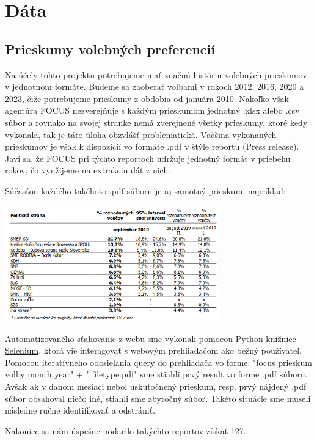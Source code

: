 \documentclass[main.tex]{subfiles}
\begin{document}
\section{Dáta}

\subsection{Prieskumy volebných preferencií}
Na účely tohto projektu potrebujeme mať značnú históriu volebných prieskumov v jednotnom formáte. Budeme sa zaoberať voľbami v rokoch 2012, 2016, 2020 a 2023, čiže potrebujeme prieskumy z obdobia od januára 2010.
Nakoľko však agentúra FOCUS nezverejňuje s každým prieskumom jednotný .xlsx alebo .csv súbor a rovnako na svojej stranke nemá zverejnené všetky prieskumy, ktoré kedy vykonala, tak je táto úloha obzvlášť problematická.
Väčšina vykonaných prieskumov je však k dispozícií vo formáte .pdf v štýle reportu (Press release). Javí sa, že FOCUS pri týchto reportoch udržuje jednotný formát v priebehu rokov, čo využijeme na extrakciu dát z nich.

Súčasťou každého takéhoto .pdf súboru je aj samotný prieskum, napríklad:

\begin{center}
\includegraphics[width=0.7\textwidth]{figs/priklad-focus-prieskumu.png}
\end{center}

Automatizovaného sťahovanie z webu sme vykonali pomocou Python knižnice \href{https://github.com/SeleniumHQ/Selenium}{Selenium}, ktorá vie interagovať s webovým prehliadačom ako bežný používateľ. Pomocou iteratívneho odosielania query do prehliadača vo forme: "focus prieskum volby {month} {year}" + " filetype:pdf" sme stiahli prvý result vo forme .pdf súboru. Avšak ak v danom mesiaci nebol uskutočnený prieskum, resp. prvý nájdený .pdf súbor obsahoval niečo iné, stiahli sme zbytočný súbor. Takéto situácie sme museli následne ručne identifikovať a odstrániť. 

Nakoniec sa nám úspešne podarilo takýchto reportov získať 127. 
\end{document}
